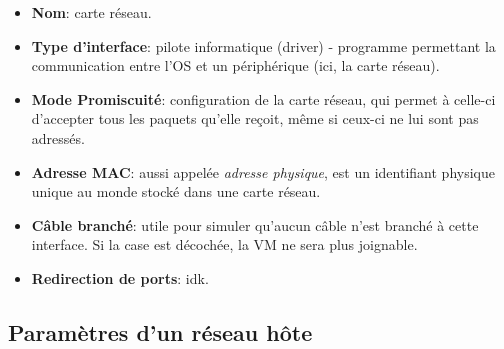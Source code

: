 \documentclass[class=article, crop=false]{standalone}
\begin{document}
\begin{itemize}
\item \textbf{Nom}: carte réseau.
\item \textbf{Type d'interface}: pilote informatique (driver) - programme permettant la communication entre l'OS et un périphérique (ici, la carte réseau).
\item \textbf{Mode Promiscuité}: configuration de la carte réseau, qui permet à celle-ci d'accepter tous les paquets qu'elle reçoit, même si ceux-ci ne lui sont pas adressés.
\item \textbf{Adresse MAC}: aussi appelée \textit{adresse physique}, est un identifiant physique unique au monde stocké dans une carte réseau.
\item \textbf{Câble branché}: utile pour simuler qu'aucun câble n'est branché à cette interface. Si la case est décochée, la VM ne sera plus joignable.
\item \textbf{Redirection de ports}: idk.
\end{itemize}










\subsection{Paramètres d'un réseau hôte}
\end{document}
